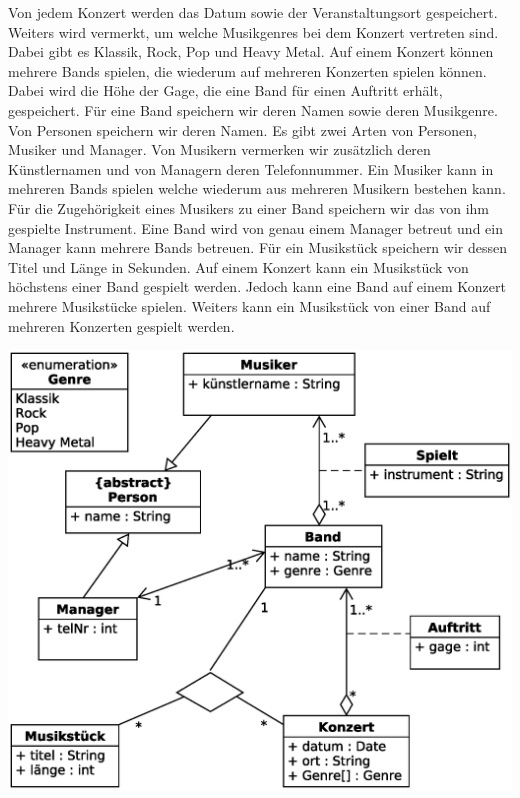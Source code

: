\documentclass[a4paper, 12pt, margins=2cm]{homework}
\begin{document}
  \begin{problem}
    Von jedem Konzert werden das Datum sowie der Veranstaltungsort gespeichert. Weiters wird vermerkt, um
welche Musikgenres bei dem Konzert vertreten sind. Dabei gibt es Klassik, Rock, Pop und Heavy Metal. Auf
einem Konzert können mehrere Bands spielen, die wiederum auf mehreren Konzerten spielen können. Dabei
wird die Höhe der Gage, die eine Band für einen Auftritt erhält, gespeichert. Für eine Band speichern wir deren
Namen sowie deren Musikgenre. Von Personen speichern wir deren Namen. Es gibt zwei Arten von Personen,
Musiker und Manager. Von Musikern vermerken wir zusätzlich deren Künstlernamen und von Managern deren
Telefonnummer. Ein Musiker kann in mehreren Bands spielen welche wiederum aus mehreren Musikern bestehen
kann. Für die Zugehörigkeit eines Musikers zu einer Band speichern wir das von ihm gespielte Instrument.
Eine Band wird von genau einem Manager betreut und ein Manager kann mehrere Bands betreuen. Für ein
Musikstück speichern wir dessen Titel und Länge in Sekunden. Auf einem Konzert kann ein Musikstück von
höchstens einer Band gespielt werden. Jedoch kann eine Band auf einem Konzert mehrere Musikstücke spielen.
Weiters kann ein Musikstück von einer Band auf mehreren Konzerten gespielt werden.
  \end{problem}
  \begin{solution}\hfill

    \begin{center}
      \includegraphics[scale=0.7]{Aufgabe4.eps}
    \end{center}
  \end{solution}
\end{document}
